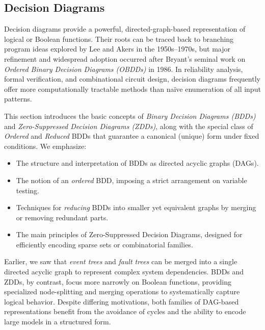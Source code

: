 \subsection{Decision Diagrams}
\label{sec:decision_diagrams}

Decision diagrams provide a powerful, directed-graph-based representation of logical or Boolean functions. Their roots can be traced back to branching program ideas explored by Lee and Akers in the 1950s–1970s, but major refinement and widespread adoption occurred after Bryant's seminal work on \emph{Ordered Binary Decision Diagrams (OBDDs)} in 1986. In reliability analysis, formal verification, and combinational circuit design, decision diagrams frequently offer more computationally tractable methods than naïve enumeration of all input patterns.

This section introduces the basic concepts of \emph{Binary Decision Diagrams (BDDs)} and \emph{Zero-Suppressed Decision Diagrams (ZDDs)}, along with the special class of \emph{Ordered} and \emph{Reduced} BDDs that guarantee a canonical (unique) form under fixed conditions. We emphasize:
\begin{itemize}
\item The structure and interpretation of BDDs as directed acyclic graphs (DAGs).
\item The notion of an \emph{ordered} BDD, imposing a strict arrangement on variable testing.
\item Techniques for \emph{reducing} BDDs into smaller yet equivalent graphs by merging or removing redundant parts.
\item The main principles of Zero-Suppressed Decision Diagrams, designed for efficiently encoding sparse sets or combinatorial families.
\end{itemize}

Earlier, we saw that \emph{event trees} and \emph{fault trees} can be merged into a single directed acyclic graph to represent complex system dependencies. BDDs and ZDDs, by contrast, focus more narrowly on Boolean functions, providing specialized node-splitting and merging operations to systematically capture logical behavior. Despite differing motivations, both families of DAG-based representations benefit from the avoidance of cycles and the ability to encode large models in a structured form.





